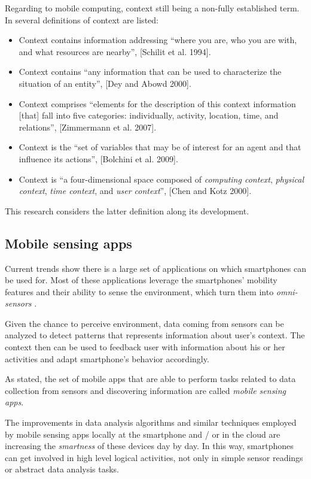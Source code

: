 Regarding to mobile computing, context still being a non-fully established term.
In \cite{Bellavista2012} several definitions of context are listed:
\begin{itemize}
  \item{Context contains information addressing ``where you are, who you are with, and what resources are nearby'', [Schilit et al. 1994]}.
  \item{Context contains ``any information that can be used to characterize the situation of an entity'', [Dey and Abowd 2000]}.
  \item{Context comprises ``elements for the description of this context information [that] fall into five categories: individually, activity, location, time, and relations'', [Zimmermann et al. 2007]}.
  \item{Context is the ``set of variables that may be of interest for an agent and that influence its actions'', [Bolchini et al. 2009]}.
  \item{Context is ``a four-dimensional space composed of \emph{computing context}, \emph{physical context}, \emph{time context}, and \emph{user context}'', [Chen and Kotz 2000]}.
\end{itemize}

This research considers the latter definition along its development.


\subsection{Mobile sensing apps}
\label{sub:mobile_sensing_apps}

Current trends show there is a large set of applications on which smartphones can be used for. Most of these applications leverage the smartphones’ mobility features and their ability to sense the environment, which turn them into \emph{omni-sensors} \cite{Perez-Torres2012}.

Given the chance to perceive environment, data coming from sensors can be analyzed to detect patterns that represents information about user’s context.
The context then can be used to feedback user with information about his or her activities and adapt smartphone’s behavior accordingly.

As stated, the set of mobile apps that are able to perform tasks related to data collection from sensors and discovering information are called \emph{mobile sensing apps}.

The improvements in data analysis algorithms and similar techniques employed by mobile sensing apps locally at the smartphone and / or in the cloud are increasing the \emph{smartness} of these devices day by day.
In this way, smartphones can get involved in high level logical activities, not only in simple sensor readings or abstract data analysis tasks.

